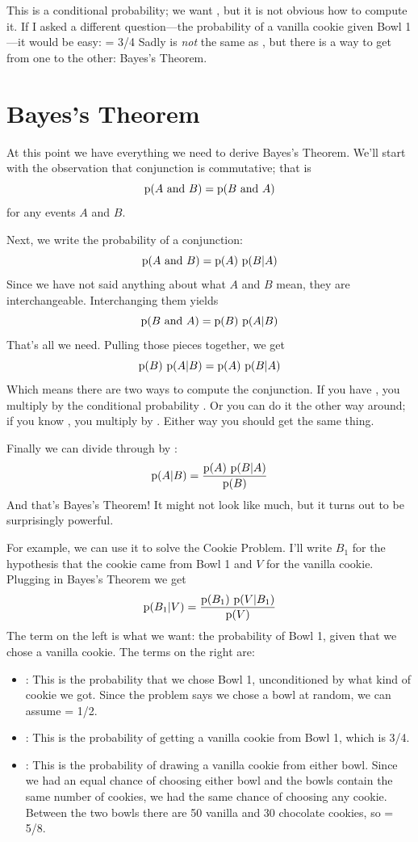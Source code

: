 \documentclass[12pt]{book}
\begin{document}
This is a conditional probability; we want , but it is not obvious how to compute it.  If I asked a
different question---the probability of a vanilla cookie given Bowl
1---it would be easy:
%
 = 3/4
%
Sadly  is {\em not} the same as , but there
is a way to get from one to the other: Bayes's Theorem.


\section{Bayes's Theorem}

At this point we have everything we need to derive Bayes's Theorem.
We'll start with the observation that conjunction is commutative; that is
%
\[ \mathrm{p}(A ~\mathrm{and}~ B) = \mathrm{p}(B ~\mathrm{and}~ A) \]
%
for any events $A$ and $B$.

Next, we write the probability of a conjunction:
%
\[ \mathrm{p}(A ~\mathrm{and}~ B) = \mathrm{p}(A)~\mathrm{p}(B|A) \]
%
Since we have not said anything about what $A$ and $B$ mean, they
are interchangeable.  Interchanging them yields
%
\[ \mathrm{p}(B ~\mathrm{and}~ A) = \mathrm{p}(B)~\mathrm{p}(A|B) \]
%
That's all we need.  Pulling those pieces together, we get
%
\[ \mathrm{p}(B)~\mathrm{p}(A|B) = \mathrm{p}(A)~\mathrm{p}(B|A) \]
%
Which means there are two ways to compute the conjunction.
If you have , you multiply by the conditional
probability .  Or you can do it the other way around; if you
know , you multiply by .  Either way you should get
the same thing.

Finally we can divide through by :
%
\[ \mathrm{p}(A|B) = \frac{\mathrm{p}(A)~\mathrm{p}(B|A)}{\mathrm{p}(B)} \]
%
And that's Bayes's Theorem!  It might not look like much, but
it turns out to be surprisingly powerful.

For example, we can use it to solve the Cookie Problem.  I'll write
$B_1$ for the hypothesis that the cookie came from Bowl 1
and $V$ for the vanilla cookie.  Plugging in Bayes's Theorem
we get
%
\[ \mathrm{p}(B_1|V) = \frac{\mathrm{p}(B_1)~\mathrm{p}(V|B_1)}{\mathrm{p}(V)} \]
%
The term on the left is what we want: the probability of Bowl 1, given
that we chose a vanilla cookie.  The terms on the right are:

\begin{itemize}

\item {}: This is the probability that we chose Bowl 1, unconditioned
by what kind of cookie we got.  Since the problem says we chose a
bowl at random, we can assume  = 1/2.

\item {}: This is the probability of getting a vanilla cookie
from Bowl 1, which is 3/4.

\item {}: This is the probability of drawing a vanilla cookie from
either bowl.  Since we had an equal chance of choosing either bowl
and the bowls contain the same number of cookies, we had the same
chance of choosing any cookie.  Between the two bowls there are
50 vanilla and 30
chocolate cookies, so  = 5/8.

\end{itemize}
\end{document}
